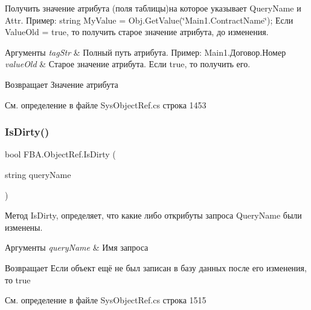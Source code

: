 Получить значение атрибута (поля таблицы)на которое указывает Query\+Name и Attr. Пример\+: string My\+Value = Obj.\+Get\+Value(\char`\"{}\+Main1.\+Contract\+Name\char`\"{}); Если Value\+Old = true, то получить старое значение атрибута, до изменения. 


\begin{DoxyParams}{Аргументы}
{\em tag\+Str} & Полный путь атрибута. Пример\+: Main1.\+Договор.\+Номер\\
\hline
{\em value\+Old} & Старое значение атрибута. Если true, то получить его.\\
\hline
\end{DoxyParams}
\begin{DoxyReturn}{Возвращает}
Значение атрибута
\end{DoxyReturn}


См. определение в файле Sys\+Object\+Ref.\+cs строка 1453

\mbox{\label{class_f_b_a_1_1_object_ref_a5959707cbde92b477ecaab82c2c5f29c}} 
\subsubsection{\texorpdfstring{Is\+Dirty()}{IsDirty()}}
{\footnotesize\ttfamily bool F\+B\+A.\+Object\+Ref.\+Is\+Dirty (\begin{DoxyParamCaption}\item[{string}]{query\+Name }\end{DoxyParamCaption})}



Метод Is\+Dirty, определяет, что какие либо открибуты запроса Query\+Name были изменены. ~\newline



\begin{DoxyParams}{Аргументы}
{\em query\+Name} & Имя запроса\\
\hline
\end{DoxyParams}
\begin{DoxyReturn}{Возвращает}
Если объект ещё не был записан в базу данных после его изменения, то true
\end{DoxyReturn}


См. определение в файле Sys\+Object\+Ref.\+cs строка 1515


